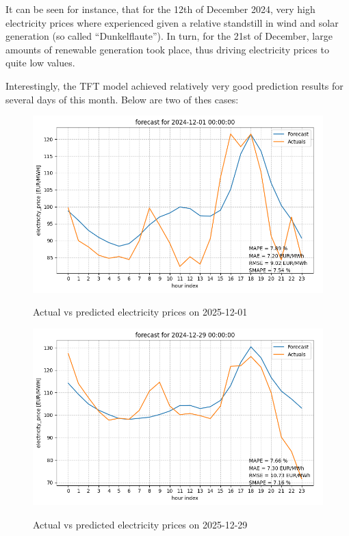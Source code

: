 \documentclass[a4paper]{article}
\begin{document}
    It can be seen for instance, that for the 12th of December 2024, very
high electricity prices where experienced given a relative standstill in
wind and solar generation (so called ``Dunkelflaute''). In turn, for the
21st of December, large amounts of renewable generation took place, thus
driving electricity prices to quite low values.

Interestingly, the TFT model achieved relatively very good prediction
results for several days of this month. Below are two of thes cases:

    \begin{figure}
\centering
{\includegraphics[keepaspectratio]{src/min_mae.png}}
\caption{Actual vs predicted electricity prices on 2025-12-01}
\end{figure}

    \begin{figure}
\centering
{\includegraphics[keepaspectratio]{src/min_mape.png}}
\caption{Actual vs predicted electricity prices on 2025-12-29}
\end{figure}
\end{document}
